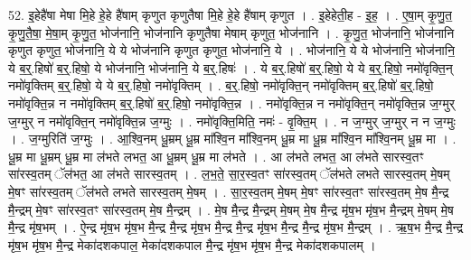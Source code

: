 \documentclass[17pt]{extarticle}
\begin{document}
52. इ॒हेहै॑षा मेषा मि॒हे हे॒हे है॑षाम् कृणुत कृणुतैषा मि॒हे हे॒हे है॑षाम् कृणुत । . इ॒हेहेती॒ह - इ॒ह॒ । . ए॒षा॒म् कृ॒णु॒त॒ कृ॒णु॒तै॒षा॒ मे॒षा॒म् कृ॒णु॒त॒ भोज॑नानि॒ भोज॑नानि कृणुतैषा मेषाम् कृणुत॒ भोज॑नानि । . कृ॒णु॒त॒ भोज॑नानि॒ भोज॑नानि कृणुत कृणुत॒ भोज॑नानि॒ ये ये भोज॑नानि कृणुत कृणुत॒ भोज॑नानि॒ ये । . भोज॑नानि॒ ये ये भोज॑नानि॒ भोज॑नानि॒ ये ब॒र्॒.हिषो॑ ब॒र्॒.हिषो॒ ये भोज॑नानि॒ भोज॑नानि॒ ये ब॒र्॒.हिषः॑ । . ये ब॒र्॒.हिषो॑ ब॒र्॒.हिषो॒ ये ये ब॒र्॒.हिषो॒ नमो॑वृक्ति॒न् नमो॑वृक्तिम् ब॒र्॒.हिषो॒ ये ये ब॒र्॒.हिषो॒ नमो॑वृक्तिम् । . ब॒र्॒.हिषो॒ नमो॑वृक्ति॒न् नमो॑वृक्तिम् ब॒र्॒.हिषो॑ ब॒र्॒.हिषो॒ नमो॑वृक्ति॒न्न न नमो॑वृक्तिम् ब॒र्॒.हिषो॑ ब॒र्॒.हिषो॒ नमो॑वृक्ति॒न्न । . नमो॑वृक्ति॒न्न न नमो॑वृक्ति॒न् नमो॑वृक्ति॒न्न ज॒ग्मुर् ज॒ग्मुर् न नमो॑वृक्ति॒न् नमो॑वृक्ति॒न्न ज॒ग्मुः । . नमो॑वृक्ति॒मिति॒ नमः॑ - वृ॒क्ति॒म् । . न ज॒ग्मुर् ज॒ग्मुर् न न ज॒ग्मुः । . ज॒ग्मुरिति॑ ज॒ग्मुः । . आ॒श्वि॒नम् धू॒म्रम् धू॒म्र मा᳚श्वि॒न मा᳚श्वि॒नम् धू॒म्र मा धू॒म्र मा᳚श्वि॒न मा᳚श्वि॒नम् धू॒म्र मा । . धू॒म्र मा धू॒म्रम् धू॒म्र मा ल॑भते लभत॒ आ धू॒म्रम् धू॒म्र मा ल॑भते । . आ ल॑भते लभत॒ आ ल॑भते सारस्व॒तꣳ सा॑रस्व॒तम् ॅल॑भत॒ आ ल॑भते सारस्व॒तम् । . ल॒भ॒ते॒ सा॒र॒स्व॒तꣳ सा॑रस्व॒तम् ॅल॑भते लभते सारस्व॒तम् मे॒षम् मे॒षꣳ सा॑रस्व॒तम् ॅल॑भते लभते सारस्व॒तम् मे॒षम् । . सा॒र॒स्व॒तम् मे॒षम् मे॒षꣳ सा॑रस्व॒तꣳ सा॑रस्व॒तम् मे॒ष मै॒न्द्र मै॒न्द्रम् मे॒षꣳ सा॑रस्व॒तꣳ सा॑रस्व॒तम् मे॒ष मै॒न्द्रम् । . मे॒ष मै॒न्द्र मै॒न्द्रम् मे॒षम् मे॒ष मै॒न्द्र मृ॑ष॒भ मृ॑ष॒भ मै॒न्द्रम् मे॒षम् मे॒ष मै॒न्द्र मृ॑ष॒भम् । . ऐ॒न्द्र मृ॑ष॒भ मृ॑ष॒भ मै॒न्द्र मै॒न्द्र मृ॑ष॒भ मै॒न्द्र मै॒न्द्र मृ॑ष॒भ मै॒न्द्र मै॒न्द्र मृ॑ष॒भ मै॒न्द्रम् । . ऋ॒ष॒भ मै॒न्द्र मै॒न्द्र मृ॑ष॒भ मृ॑ष॒भ मै॒न्द्र मेका॑दशकपाल॒ मेका॑दशकपाल मै॒न्द्र मृ॑ष॒भ मृ॑ष॒भ मै॒न्द्र मेका॑दशकपालम् । \newline
\end{document}
